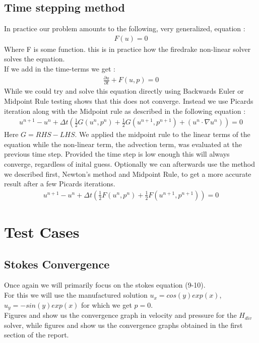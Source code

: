 \documentclass[11pt,twoside,a4paper]{article}
\begin{document}
\subsection{Time stepping method}
In practice our problem amounts to the following, very generalized, equation : 
\begin{align}
F(u) = 0
\end{align}
Where F is some function. this is in practice how the firedrake non-linear solver solves the equation.\\
If we add in the time-terms we get :
\begin{align}
\frac{\partial u}{\partial t} + F(u,p) = 0
\end{align}
While we could try and solve this equation directly using Backwards Euler or Midpoint Rule testing shows that this does not converge. Instead we use Picards iteration along with the Midpoint rule as described in the following equation :
\begin{align}
u^{n+1} - u^n + \Delta t (\frac{1}{2}G(u^n,p^n) + \frac{1}{2} G(u^{n+1},p^{n+1}) + ( u^n \cdot \nabla u^n) ) = 0
\end{align}
Here $G = RHS - LHS $. We applied the midpoint rule to the linear terms of the equation while the non-linear term, the advection term, was evaluated at the previous time step. Provided the time step is low enough this will always converge, regardless of inital guess.
Optionally we can afterwards use the method we described first, Newton's method and Midpoint Rule, to get a more accurate result after a few Picards iterations.
\begin{align}
u^{n+1} - u^n + \Delta t (\frac{1}{2}F(u^n,p^n) + \frac{1}{2} F(u^{n+1},p^{n+1})) = 0
\end{align}

\section{Test Cases}
\subsection{Stokes Convergence}

Once again we will primarily focus on the stokes equation (9-10).\\
For this we will use the manufactured solution $u_x = cos(y) exp(x)$, $u_y = -sin(y) exp(x)$ for which we get $p = 0$.\\
Figures and show us the convergence graph in velocity and pressure for the $H_{div}$ solver, while figures and show us the convergence graphs obtained in the first section of the report.\\
\end{document}
